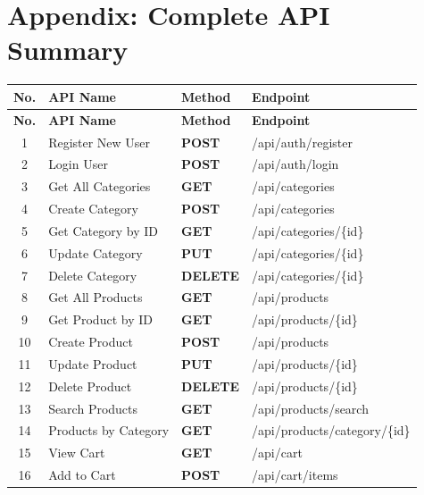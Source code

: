 \documentclass[12pt, a4paper]{article}
\begin{document}
\section{Appendix: Complete API Summary}

\begin{longtable}{|c|l|l|p{5cm}|}
\hline
\textbf{No.} & \textbf{API Name} & \textbf{Method} & \textbf{Endpoint} \\
\hline
\endfirsthead
\hline
\textbf{No.} & \textbf{API Name} & \textbf{Method} & \textbf{Endpoint} \\
\hline
\endhead
1 & Register New User & \textcolor{postcolor}{\textbf{POST}} & /api/auth/register \\
\hline
2 & Login User & \textcolor{postcolor}{\textbf{POST}} & /api/auth/login \\
\hline
3 & Get All Categories & \textcolor{getcolor}{\textbf{GET}} & /api/categories \\
\hline
4 & Create Category & \textcolor{postcolor}{\textbf{POST}} & /api/categories \\
\hline
5 & Get Category by ID & \textcolor{getcolor}{\textbf{GET}} & /api/categories/\{id\} \\
\hline
6 & Update Category & \textcolor{putcolor}{\textbf{PUT}} & /api/categories/\{id\} \\
\hline
7 & Delete Category & \textcolor{deletecolor}{\textbf{DELETE}} & /api/categories/\{id\} \\
\hline
8 & Get All Products & \textcolor{getcolor}{\textbf{GET}} & /api/products \\
\hline
9 & Get Product by ID & \textcolor{getcolor}{\textbf{GET}} & /api/products/\{id\} \\
\hline
10 & Create Product & \textcolor{postcolor}{\textbf{POST}} & /api/products \\
\hline
11 & Update Product & \textcolor{putcolor}{\textbf{PUT}} & /api/products/\{id\} \\
\hline
12 & Delete Product & \textcolor{deletecolor}{\textbf{DELETE}} & /api/products/\{id\} \\
\hline
13 & Search Products & \textcolor{getcolor}{\textbf{GET}} & /api/products/search \\
\hline
14 & Products by Category & \textcolor{getcolor}{\textbf{GET}} & /api/products/category/\{id\} \\
\hline
15 & View Cart & \textcolor{getcolor}{\textbf{GET}} & /api/cart \\
\hline
16 & Add to Cart & \textcolor{postcolor}{\textbf{POST}} & /api/cart/items \\

\end{longtable}
\end{document}
